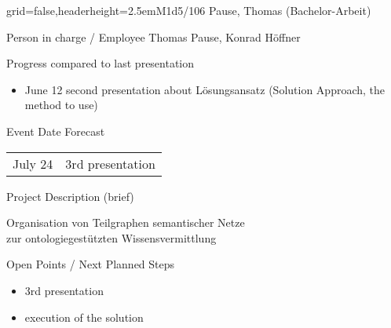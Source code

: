 \documentclass[english]{kiesgrube}
\begin{document}

\newpage

\begin{poster}{grid=false,headerheight=2.5em}{}{M1d5/106 Pause, Thomas (Bachelor-Arbeit)}{}{}
\begin{posterbox}[name=person,column=0,row=0]{Person in charge / Employee}
Thomas Pause, Konrad Höffner
\end{posterbox}
\begin{posterbox}[name=progress,below=person]{Progress compared to last presentation}
\begin{itemize}
\item June 12 second presentation about Lösungsansatz (Solution Approach, the method to use)
\end{itemize}
\end{posterbox}
\begin{posterbox}[name=event,below=progress]{Event Date Forecast}
\begin{tabulary}{\textwidth}{lL}
July 24	&3rd presentation\\
\end{tabulary}
\end{posterbox}
\begin{posterbox}[name=description,column=1,row=0]{Project Description (brief)}
\begin{center}
Organisation von Teilgraphen semantischer Netze\\
zur ontologiegestützten Wissensvermittlung
\end{center}
\end{posterbox}
\begin{posterbox}[name=open,column=1,below=description]{Open Points / Next Planned Steps}
\begin{itemize}
\item 3rd presentation
\item execution of the solution

\end{itemize}
\end{posterbox}
\end{poster}
\end{document}
